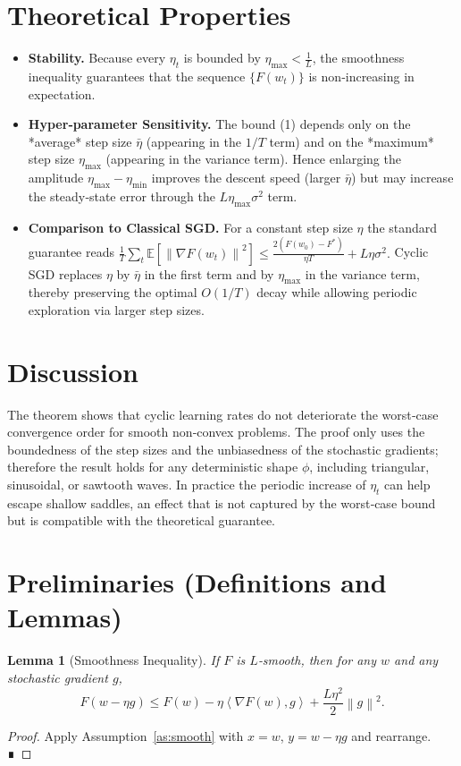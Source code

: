 \documentclass{article}
\newtheorem{lemma}{Lemma}
\newcommand{\E}{\mathbb{E}}
\newcommand{\norm}[1]{\left\|#1\right\|}
\newcommand{\inner}[2]{\left\langle #1,#2\right\rangle}
\begin{document}
\section*{Theoretical Properties}
\begin{itemize}
\item \textbf{Stability.}  Because every $\eta_{t}$ is bounded by $\eta_{\max}<\frac{1}{L}$, the smoothness inequality guarantees that the sequence $\{F(w_{t})\}$ is non‑increasing in expectation.
\item \textbf{Hyper‑parameter Sensitivity.}  The bound (1) depends only on the *average* step size $\bar{\eta}$ (appearing in the $1/T$ term) and on the *maximum* step size $\eta_{\max}$ (appearing in the variance term).  Hence enlarging the amplitude $\eta_{\max}-\eta_{\min}$ improves the descent speed (larger $\bar{\eta}$) but may increase the steady‑state error through the $L\eta_{\max}\sigma^{2}$ term.
\item \textbf{Comparison to Classical SGD.}  For a constant step size $\eta$ the standard guarantee reads 
\(
\frac{1}{T}\sum_{t}\E\!\left[\norm{\nabla F(w_{t})}^{2}\right]
\le \frac{2(F(w_{0})-F^{*})}{\eta T}+L\eta\sigma^{2}.
\)
Cyclic SGD replaces $\eta$ by $\bar{\eta}$ in the first term and by $\eta_{\max}$ in the variance term, thereby preserving the optimal $O(1/T)$ decay while allowing periodic exploration via larger step sizes.
\end{itemize}

\section*{Discussion}
The theorem shows that cyclic learning rates do not deteriorate the worst‑case convergence order for smooth non‑convex problems.  The proof only uses the boundedness of the step sizes and the unbiasedness of the stochastic gradients; therefore the result holds for any deterministic shape $\phi$, including triangular, sinusoidal, or sawtooth waves.  In practice the periodic increase of $\eta_{t}$ can help escape shallow saddles, an effect that is not captured by the worst‑case bound but is compatible with the theoretical guarantee.

\newpage
\section*{Preliminaries (Definitions and Lemmas)}
\begin{lemma}[Smoothness Inequality]\label{lem:smooth}
If $F$ is $L$‑smooth, then for any $w$ and any stochastic gradient $g$,
\[
F(w-\eta g)
\le F(w)-\eta\inner{\nabla F(w)}{g}
+\frac{L\eta^{2}}{2}\norm{g}^{2}.
\]
\end{lemma}
\begin{proof}
Apply Assumption~\ref{as:smooth} with $x=w$, $y=w-\eta g$ and rearrange. ∎
\end{proof}
\end{document}
